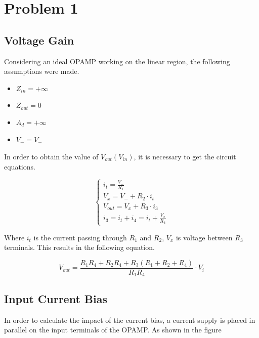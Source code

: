 \section{Problem 1}

\subsection{Voltage Gain}

Considering an ideal OPAMP  working on the linear region, the following assumptions were made.

\begin{itemize}
    \item $Z_{in} = +\infty$
    \item $Z_{out} = 0$
    \item $A_d = +\infty$
    \item $V_+ = V_-$
\end{itemize}

In order to obtain the value of $V_{out}(V_{in})$, it is necessary to get the circuit equations.

\begin{equation}
    \begin{cases}
    
        i_{t}   = \frac{V_-}{R_1}\\
        V_x     = V_- + R_2 \cdot i_t\\ 
        V_{out} = V_x + R_3\cdot i_3\\
        i_3     = i_t + i_4 = i_t + \frac{V_x}{R_4} 

    
    \end{cases}
\end{equation}

Where $i_t$ is the current passing through $R_1$ and $R_2$, $V_x$ is voltage between $R_3$ terminals.
This results in the following equation.

\begin{equation}
    V_{out} = \frac{ R_{1} R_{4} + R_{2} R_{4} + R_{3} \left(R_{1} + R_{2} + R_{4}\right)}{R_{1} R_{4}}\cdot V_{i}
\end{equation}

\subsection{ Input Current Bias }

In order to calculate the impact of the current bias, a current supply is placed in parallel on the input terminals of the OPAMP. As shown in the figure 


